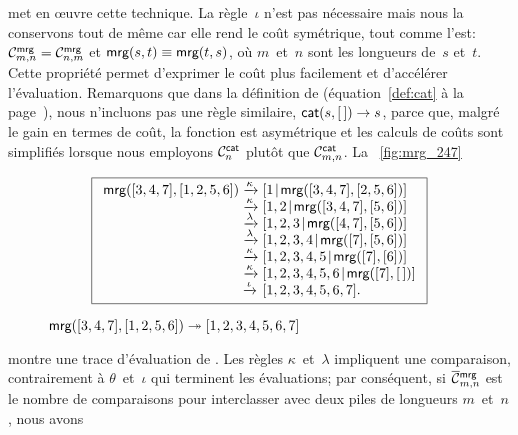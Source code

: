 met en œuvre cette technique. La règle~\(\iota\) n'est pas
nécessaire mais nous la conservons tout de même car elle rend le coût
symétrique, tout comme  l'est:
\(\C{\fun{mrg}}{m,n} =
\C{\fun{mrg}}{n,m}\) et
\(\fun{mrg}(s,t) \equiv \fun{mrg}(t,s)\), où \(m\)~et~\(n\) sont les
longueurs de~\(s\) et~\(t\). Cette propriété permet d'exprimer le coût
plus facilement et d'accélérer l'évaluation. Remarquons que dans la
définition de 
(équation~\eqref{def:cat} à la page~\pageref{def:cat}), nous
n'incluons pas une règle similaire, \(\fun{cat}(s,\el) \rightarrow
s\), parce que, malgré le gain en termes de coût, la fonction est
asymétrique et les calculs de coûts sont simplifiés lorsque nous
employons \(\C{\fun{cat}}{n}\) plutôt
que \(\C{\fun{cat}}{m,n}\). La \fig~\vref{fig:mrg_247}
\begin{figure}
\begin{equation*}
\boxed{%
\begin{array}{r@{\;}l@{\;}l}
  \fun{mrg}([3,4,7],[1,2,5,6])
& \xrightarrow{\smash{\kappa}}
& \cons{1}{\fun{mrg}([3,4,7],[2,5,6])}\\
& \xrightarrow{\smash{\kappa}}
& \cons{1,2}{\fun{mrg}([3,4,7],[5,6])}\\
& \xrightarrow{\smash{\lambda}}
& \cons{1,2,3}{\fun{mrg}([4,7],[5,6])}\\
& \xrightarrow{\smash{\lambda}}
& \cons{1,2,3,4}{\fun{mrg}([7],[5,6])}\\
& \xrightarrow{\smash{\kappa}}
& \cons{1,2,3,4,5}{\fun{mrg}([7],[6])}\\
& \xrightarrow{\smash{\kappa}}
& \cons{1,2,3,4,5,6}{\fun{mrg}([7],\el)}\\
& \xrightarrow{\smash{\iota}}
& [1,2,3,4,5,6,7].
\end{array}}
\end{equation*}
\caption{\(\fun{mrg}([3,4,7],[1,2,5,6]) \twoheadrightarrow
  [1,2,3,4,5,6,7]\)}
\label{fig:mrg_247}
\end{figure}
montre une trace d'évaluation de . Les règles
\(\kappa\)~et~\(\lambda\) impliquent une comparaison, contrairement à
\(\theta\)~et~\(\iota\) qui terminent les évaluations; par conséquent,
si \(\OC{\fun{mrg}}{m,n}\) est le
nombre de comparaisons pour interclasser avec
 deux piles de longueurs
\(m\)~et~\(n\), nous avons
